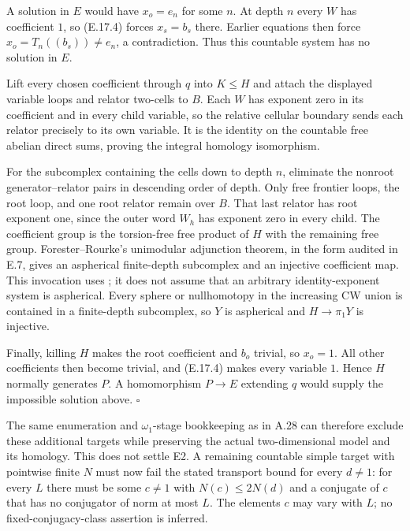 A solution in $E$ would have $x_o=e_n$ for some $n$.
At depth $n$ every $W$ has coefficient $1$, so (E.17.4)
forces $x_s=b_s$ there. Earlier equations then force
$x_o=T_n((b_s))\ne e_n$, a contradiction. Thus this countable
system has no solution in $E$.

Lift every chosen coefficient through $q$ into $K\leq H$
and attach the displayed variable loops and relator two-cells
to $B$. Each $W$ has exponent zero in its coefficient and
in every child variable, so the relative cellular boundary
sends each relator precisely to its own variable. It is the
identity on the countable free abelian direct sums, proving
the integral homology isomorphism.

For the subcomplex containing the cells down to depth $n$,
eliminate the nonroot generator--relator pairs in descending
order of depth. Only free frontier loops, the root loop,
and one root relator remain over $B$. That last relator has
root exponent one, since the outer word $W_h$ has exponent
zero in every child. The coefficient group is the torsion-free
free product of $H$ with the remaining free group.
Forester--Rourke's unimodular adjunction theorem, in the
form audited in E.7, gives an aspherical finite-depth
subcomplex and an injective coefficient map. This invocation
uses \cite[Main Theorem]{EForesterRourkeDiagrams}; it does not
assume that an arbitrary identity-exponent system is aspherical.
Every sphere or nullhomotopy in the increasing CW union is
contained in a finite-depth subcomplex, so $Y$ is aspherical
and $H\to\pi_1Y$ is injective.

Finally, killing $H$ makes the root coefficient and $b_o$
trivial, so $x_o=1$. All other coefficients then become
trivial, and (E.17.4) makes every variable $1$. Hence $H$
normally generates $P$. A homomorphism $P\to E$ extending
$q$ would supply the impossible solution above.
\hfill$\square$

The same enumeration and $\omega_1$-stage bookkeeping as in
A.28 can therefore exclude these additional targets while
preserving the actual two-dimensional model and its homology.
This does not settle E2. A remaining countable simple target
with pointwise finite $N$ must now fail the stated transport
bound for every $d\ne1$: for every $L$ there must be some
$c\ne1$ with $N(c)\leq2N(d)$ and a conjugate of $c$ that
has no conjugator of norm at most $L$. The elements $c$ may
vary with $L$; no fixed-conjugacy-class assertion is inferred.

